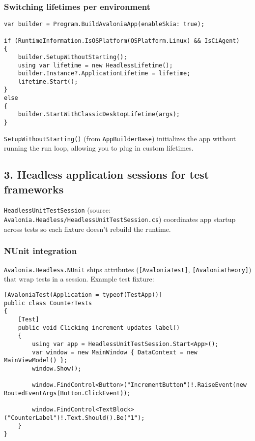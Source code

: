 \subsubsection{Switching lifetimes per
environment}\label{switching-lifetimes-per-environment}

\begin{lstlisting}
var builder = Program.BuildAvaloniaApp(enableSkia: true);

if (RuntimeInformation.IsOSPlatform(OSPlatform.Linux) && IsCiAgent)
{
    builder.SetupWithoutStarting();
    using var lifetime = new HeadlessLifetime();
    builder.Instance?.ApplicationLifetime = lifetime;
    lifetime.Start();
}
else
{
    builder.StartWithClassicDesktopLifetime(args);
}
\end{lstlisting}

\passthrough{\lstinline!SetupWithoutStarting()!} (from
\passthrough{\lstinline!AppBuilderBase!}) initializes the app without
running the run loop, allowing you to plug in custom lifetimes.

\subsection{3. Headless application sessions for test
frameworks}\label{headless-application-sessions-for-test-frameworks}

\passthrough{\lstinline!HeadlessUnitTestSession!} (source:
\passthrough{\lstinline!Avalonia.Headless/HeadlessUnitTestSession.cs!})
coordinates app startup across tests so each fixture doesn't rebuild the
runtime.

\subsubsection{NUnit integration}\label{nunit-integration}

\passthrough{\lstinline!Avalonia.Headless.NUnit!} ships attributes
(\passthrough{\lstinline![AvaloniaTest]!},
\passthrough{\lstinline![AvaloniaTheory]!}) that wrap tests in a
session. Example test fixture:

\begin{lstlisting}
[AvaloniaTest(Application = typeof(TestApp))]
public class CounterTests
{
    [Test]
    public void Clicking_increment_updates_label()
    {
        using var app = HeadlessUnitTestSession.Start<App>();
        var window = new MainWindow { DataContext = new MainViewModel() };
        window.Show();

        window.FindControl<Button>("IncrementButton")!.RaiseEvent(new RoutedEventArgs(Button.ClickEvent));

        window.FindControl<TextBlock>("CounterLabel")!.Text.Should().Be("1");
    }
}
\end{lstlisting}

